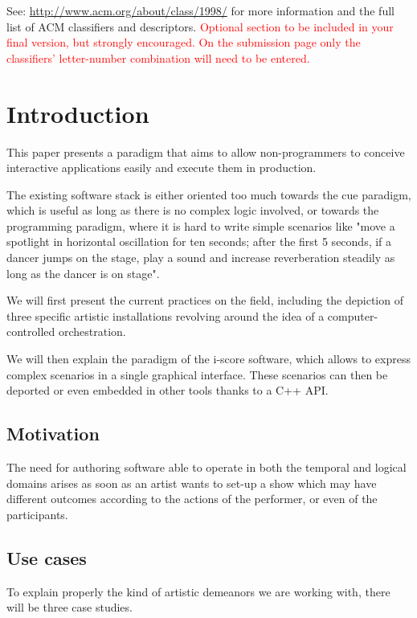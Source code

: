 \documentclass{sigchi}
\begin{document}

See: \url{http://www.acm.org/about/class/1998/}
for more information and the full list of ACM classifiers
and descriptors. \newline
\textcolor{red}{Optional section to be included in your final version, 
but strongly encouraged. On the submission page only the classifiers’ 
letter-number combination will need to be entered.}

\section{Introduction}
This paper presents a paradigm that aims to allow non-programmers 
to conceive interactive applications easily and execute them in production.

The existing software stack is either oriented too much towards the 
cue paradigm, which is useful as long as there is no complex logic involved, 
or towards the programming paradigm, where it is hard to write simple scenarios 
like "move a spotlight in horizontal oscillation for ten seconds; after the first 5 
seconds, if a dancer jumps on the stage, play a sound and increase reverberation steadily as long as the dancer is on stage".

We will first present the current practices on the field, including the depiction of three specific artistic installations revolving around the idea of a computer-controlled orchestration.

We will then explain the paradigm of the i-score software, which allows to express complex scenarios in a single graphical interface. These scenarios can then be deported or even embedded in other tools thanks to a C++ API. 

\subsection{Motivation}
The need for authoring software able to operate in both the temporal and logical domains arises as soon as an artist wants to set-up a show which may have different outcomes according to the actions of the performer, or even of the participants.

\subsection{Use cases}
To explain properly the kind of artistic demeanors we are working with, there will be three case studies.
\end{document}
